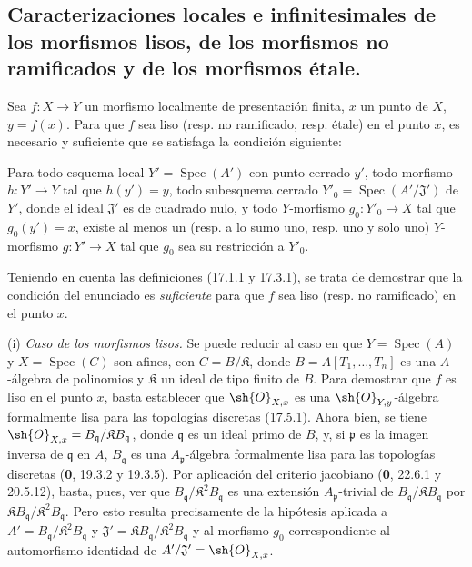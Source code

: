 \subsection{Caracterizaciones locales e infinitesimales de los morfismos lisos, de los morfismos no ramificados y de los morfismos étale.}
\label{subsection:IV.17.14}

\begin{proposition}[17.14.1]
\label{IV.17.14.1}
Sea $f:X\to Y$ un morfismo localmente de presentación finita, $x$ un punto de $X$, $y=f(x)$. Para que $f$ sea liso \textup{(resp.} no ramificado, \textup{resp.} étale\textup{)} en el punto $x$, es necesario y suficiente que se satisfaga la condición siguiente:

Para todo \textup{esquema local} $Y'=\operatorname{Spec}(A')$ con punto cerrado $y'$, todo morfismo $h:Y'\to Y$ tal que $h(y')=y$, todo subesquema cerrado $Y'_0=\operatorname{Spec}(A'/\mathfrak{J}')$ de $Y'$, donde el ideal $\mathfrak{J}'$ es de cuadrado nulo, y todo $Y$-morfismo $g_0:Y'_0\to X$ tal que $g_0(y')=x$, existe al menos un \textup{(resp.} a lo sumo uno, \textup{resp.} uno y solo uno\textup{)} $Y$-morfismo $g:Y'\to X$ tal que $g_0$ sea su restricción a $Y'_0$.
\end{proposition}

Teniendo en cuenta las definiciones (17.1.1 y 17.3.1), se trata de demostrar que la condición del enunciado es \emph{suficiente} para que $f$ sea liso (resp. no ramificado) en el punto $x$.

(i) \emph{Caso de los morfismos lisos.} Se puede reducir al caso en que $Y=\operatorname{Spec}(A)$ y $X=\operatorname{Spec}(C)$ son afines, con $C=B/\mathfrak{K}$, donde $B=A[T_1,\ldots,T_n]$ es una $A$-álgebra de polinomios y $\mathfrak{K}$ un ideal de tipo finito de $B$. Para demostrar que $f$ es liso en el punto $x$, basta establecer que $\sh{O}_{X,x}$ es una $\sh{O}_{Y,y}$-álgebra formalmente lisa para las topologías discretas (17.5.1). Ahora bien, se tiene $\sh{O}_{X,x}=B_{\mathfrak q}/\mathfrak KB_{\mathfrak q}$, donde $\mathfrak q$ es un ideal primo de $B$, y, si $\mathfrak p$ es la imagen inversa de $\mathfrak q$ en $A$, $B_{\mathfrak q}$ es una $A_{\mathfrak p}$-álgebra formalmente lisa para las topologías discretas (\textbf 0, 19.3.2 y 19.3.5). Por aplicación del criterio jacobiano (\textbf 0, 22.6.1 y 20.5.12), basta, pues, ver que $B_{\mathfrak q}/\mathfrak{K}^2B_{\mathfrak q}$ es una extensión $A_{\mathfrak p}$-trivial de $B_{\mathfrak q}/\mathfrak KB_{\mathfrak q}$ por $\mathfrak KB_{\mathfrak q}/\mathfrak{K}^2B_{\mathfrak q}$. Pero esto resulta precisamente de la hipótesis aplicada a $A'=B_{\mathfrak q}/\mathfrak{K}^2B_{\mathfrak q}$ y $\mathfrak{J}'=\mathfrak KB_{\mathfrak q}/\mathfrak{K}^2B_{\mathfrak q}$ y al morfismo $g_0$ correspondiente al automorfismo identidad de $A'/\mathfrak{J}'=\sh{O}_{X,x}$.

